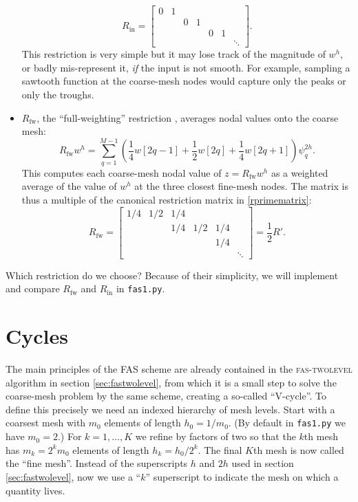 \documentclass[letterpaper,final,12pt,reqno]{amsart}
\newcommand{\Rin}{R_{\text{in}}}
\newcommand{\Rfw}{R_{\text{fw}}}
\begin{document}
\begin{itemize}
\begin{equation}
\Rin = \begin{bmatrix}
0 & 1 &   &   &   &   &\\
  &   & 0 & 1 &   &   & \\
  &   &   &   & 0 & 1 & \\
  &   &   &   &   &   & \ddots
\end{bmatrix}. \label{rinmatrix}
\end{equation}
This restriction is very simple but it may lose track of the magnitude of $w^h$, or badly mis-represent it, \emph{if} the input is not smooth.  For example, sampling a sawtooth function at the coarse-mesh nodes would capture only the peaks or only the troughs.
\item $\Rfw$, the ``full-weighting'' restriction \cite{Briggsetal2000}, averages nodal values onto the coarse mesh:
\begin{equation}
  \Rfw w^h = \sum_{q=1}^{M-1} \left(\frac{1}{4} w[2q-1] + \frac{1}{2} w[2q] + \frac{1}{4} w[2q+1]\right) \psi_q^{2h}. \label{rfwdefinition}
\end{equation}
This computes each coarse-mesh nodal value of $z=\Rfw w^h$ as a weighted average of the value of $w^h$ at the three closest fine-mesh nodes.  The matrix is thus a multiple of the canonical restriction matrix in \eqref{rprimematrix}:
\begin{equation}
\Rfw = \begin{bmatrix}
1/4 & 1/2 & 1/4 &     &     &  \\
    &     & 1/4 & 1/2 & 1/4 &  \\
    &     &     &     & 1/4 &  \\
    &     &     &     &     & \ddots
\end{bmatrix} = \frac{1}{2} R'. \label{rfwmatrix}
\end{equation}
\end{itemize}

\medskip
Which restriction do we choose?  Because of their simplicity, we will implement and compare $\Rfw$ and $\Rin$ in \texttt{fas1.py}.


\section{Cycles} \label{sec:cycles}

The main principles of the FAS scheme are already contained in the \textsc{fas-twolevel} algorithm in section \ref{sec:fastwolevel}, from which it is a small step to solve the coarse-mesh problem by the same scheme, creating a so-called ``V-cycle''.  To define this precisely we need an indexed hierarchy of mesh levels.  Start with a coarsest mesh with $m_0$ elements of length $h_0=1/m_0$.  (By default in \texttt{fas1.py} we have $m_0=2$.)  For $k=1,\dots,K$ we refine by factors of two so that the $k$th mesh has $m_k=2^k m_0$ elements of length $h_k=h_0/2^k$.  The final $K$th mesh is now called the ``fine mesh''.  Instead of the superscripts $h$ and $2h$ used in section \ref{sec:fastwolevel}, now we use a ``$k$'' superscript to indicate the mesh on which a quantity lives.
\end{document}

